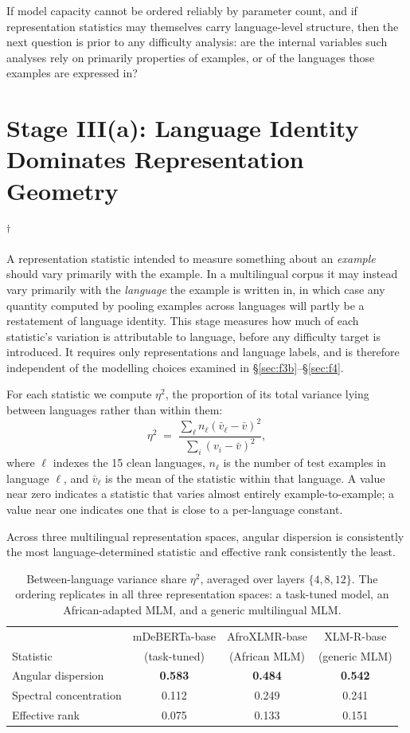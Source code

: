 \documentclass[11pt]{article}
\newcommand{\claim}[1]{#1}   %
\newcommand{\nodelta}{\textsuperscript{$\dagger$}}
\begin{document}
If model capacity cannot be ordered reliably by parameter count, and if
representation statistics may themselves carry language-level structure, then the
next question is prior to any difficulty analysis: are the internal variables such
analyses rely on primarily properties of examples, or of the languages those
examples are expressed in?

\section{Stage III(a): Language Identity Dominates Representation Geometry}\nodelta
\label{sec:f3a}

A representation statistic intended to measure something about an \emph{example}
should vary primarily with the example. In a multilingual corpus it may instead
vary primarily with the \emph{language} the example is written in, in which case
any quantity computed by pooling examples across languages will partly be a
restatement of language identity. This stage measures how much of each
statistic's variation is attributable to language, before any difficulty target
is introduced. It requires only representations and language labels, and is
therefore independent of the modelling choices examined in
\S\ref{sec:f3b}--\S\ref{sec:f4}.

For each statistic we compute $\eta^2$, the proportion of its total variance
lying between languages rather than within them:
\begin{equation}
\eta^2 \;=\; \frac{\sum_{\ell} n_\ell (\bar{v}_\ell - \bar{v})^2}
                  {\sum_{i} (v_i - \bar{v})^2},
\label{eq:eta2}
\end{equation}
where $\ell$ indexes the 15 clean languages, $n_\ell$ is the number of test
examples in language $\ell$, and $\bar{v}_\ell$ is the mean of the statistic
within that language. A value near zero indicates a statistic that varies almost
entirely example-to-example; a value near one indicates one that is close to a
per-language constant.

\claim{Across three multilingual representation spaces, angular dispersion is
consistently the most language-determined statistic and effective rank
consistently the least.}

\begin{table}[t]
\centering
\small
\begin{tabular}{lccc}
\toprule
& mDeBERTa-base & AfroXLMR-base & XLM-R-base \\
Statistic & (task-tuned) & (African MLM) & (generic MLM) \\
\midrule
Angular dispersion     & \textbf{0.583} & \textbf{0.484} & \textbf{0.542} \\
Spectral concentration & 0.112 & 0.249 & 0.241 \\
Effective rank         & 0.075 & 0.133 & 0.151 \\
\bottomrule
\end{tabular}
\caption{Between-language variance share $\eta^2$, averaged over layers
$\{4,8,12\}$. The ordering replicates in all three representation spaces: a
task-tuned model, an African-adapted MLM, and a generic multilingual MLM.}
\label{tab:eta2}
\end{table}
\end{document}
